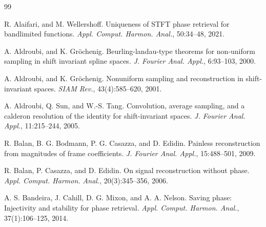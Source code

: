 \documentclass[12pt,oneside,reqno]{amsart}
\numberwithin{equation}{section}
\begin{document}
\begin{thebibliography}{99}
	
	
	R. Alaifari, and M. Wellershoff. Uniqueness of STFT phase retrieval for bandlimited functions. \emph{Appl. Comput. Harmon. Anal.}, 50:34--48, 2021.
	
	
	A. Aldroubi, and K. Gr{\"o}chenig. Beurling-landau-type theorems for non-uniform sampling in shift invariant spline spaces. \emph{J. Fourier Anal. Appl.}, 6:93--103, 2000.
	
	A. Aldroubi, and K. Gr{\"o}chenig. Nonuniform sampling and reconstruction in shift-invariant spaces. \emph{SIAM Rev.}, 43(4):585--620, 2001.
	
	
	A. Aldroubi, Q. Sun, and W.-S. Tang. Convolution, average sampling, and a calderon resolution of the identity for shift-invariant spaces. \emph{J. Fourier Anal. Appl.}, 11:215--244, 2005.
	
	
	
	R. Balan, B. G. Bodmann, P. G. Casazza, and D. Edidin. Painless reconstruction from magnitudes of frame coefficients. \emph{J. Fourier Anal. Appl.}, 15:488--501, 2009.
	
	R. Balan, P. Casazza, and D. Edidin. On signal reconstruction without phase. \emph{Appl. Comput. Harmon. Anal.}, 20(3):345--356, 2006.
	
	A. S. Bandeira, J. Cahill, D. G. Mixon, and A. A. Nelson. Saving phase: Injectivity and stability for phase retrieval. \emph{Appl. Comput. Harmon. Anal.}, 37(1):106--125, 2014.
	

\end{thebibliography}
\end{document}
